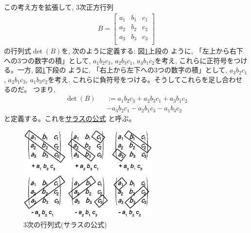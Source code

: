 この考え方を拡張して, 3次正方行列
\begin{eqnarray}
B=\begin{bmatrix}a_1 & b_1 & c_1\\
a_2 & b_2 & c_2\\
a_3 & b_3 & c_3\\
\end{bmatrix}\label{eq:univ_matrix_B}
\end{eqnarray}
の行列式$\det (B)$を, 次のように定義する: 図\ref{fig:Sarrus}上段の
ように, 「左上から右下への3つの数字の積」として, $a_1b_2c_3$, $a_2b_3c_1$, 
$a_3b_1c_2$を考え, これらに正符号をつける。一方, 図\ref{fig:Sarrus}下段の
ように, 「右上から左下への3つの数字の積」として, $a_3b_2c_1$, $a_2b_1c_3$, 
$a_1b_3c_2$を考え, これらに負符号をつける。そうしてこれらを足し合わせるのだ。
つまり, 
\begin{equation}\begin{split}
\det(B)&&:=a_1b_2c_3+a_2b_3c_1+a_3b_1c_2\\
       &&-a_3b_2c_1-a_2b_1c_3-a_1b_3c_2
\end{split}\label{eq:univ_matrix_Sarrus}\end{equation}
と定義する。これを\underline{サラスの公式} と呼ぶ。
\begin{figure}[h]
    \centering
    \includegraphics[width=7cm]{Sarrus.eps}
    \caption{3次の行列式(サラスの公式)}\label{fig:Sarrus}
\end{figure}
\mv


